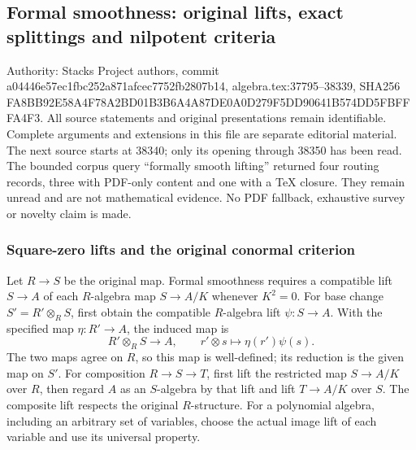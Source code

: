 \subsection{Formal smoothness: original lifts, exact splittings and nilpotent criteria}\label{algebra-proof-048-formal-smoothness-original-lifts-exact-splittings-and-nilpotent-criteria}

Authority: Stacks Project authors, commit a044\allowbreak{}46e5\allowbreak{}7ec1\allowbreak{}fbc2\allowbreak{}52a8\allowbreak{}71af\allowbreak{}cec7\allowbreak{}752f\allowbreak{}b280\allowbreak{}7b14, algebra.tex:37795--38339, SHA256 FA8B\allowbreak{}B92E\allowbreak{}58A4\allowbreak{}F78A\allowbreak{}2BD0\allowbreak{}1B3B\allowbreak{}6A4A\allowbreak{}87DE\allowbreak{}0A0D\allowbreak{}279F\allowbreak{}5DD9\allowbreak{}0641\allowbreak{}B574\allowbreak{}DD5F\allowbreak{}BFFF\allowbreak{}A4F3. All source statements and original presentations remain identifiable. Complete arguments and extensions in this file are separate editorial material. The next source starts at 38340; only its opening through 38350 has been read. The bounded corpus query ``formally smooth lifting'' returned four routing records, three with PDF-only content and one with a TeX closure. They remain unread and are not mathematical evidence. No PDF fallback, exhaustive survey or novelty claim is made.

\subsubsection{Square-zero lifts and the original conormal criterion}\label{algebra-proof-048-square-zero-lifts-and-the-original-conormal-criterion}

Let \(R\to S\) be the original map. Formal smoothness requires a compatible lift \(S\to A\) of each \(R\)-algebra map \(S\to A/K\) whenever \(K^2=0\). For base change \(S'=R'\otimes_RS\), first obtain the compatible \(R\)-algebra lift \(\psi:S\to A\). With the specified map \(\eta:R'\to A\), the induced map is \[
R'\otimes_RS\longrightarrow A,\qquad r'\otimes s\longmapsto\eta(r')\psi(s).
\] The two maps agree on \(R\), so this map is well-defined; its reduction is the given map on \(S'\). For composition \(R\to S\to T\), first lift the restricted map \(S\to A/K\) over \(R\), then regard \(A\) as an \(S\)-algebra by that lift and lift \(T\to A/K\) over \(S\). The composite lift respects the original \(R\)-structure. For a polynomial algebra, including an arbitrary set of variables, choose the actual image lift of each variable and use its universal property.

